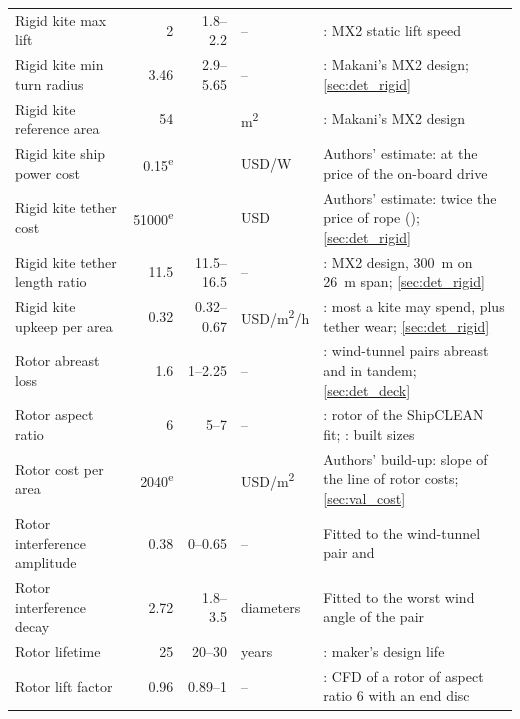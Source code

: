 \begin{longtable}{@{}>{\raggedright\arraybackslash}p{3.4cm}rr>{\raggedright\arraybackslash}p{1.4cm}>{\raggedright\arraybackslash}p{5.8cm}@{}}
Rigid kite max lift & \num{2} & \num{1.8}--\num{2.2} & -- & \citet[Table 1]{joshi2024powercurve}: MX2 static lift speed \\
Rigid kite min turn radius & \num{3.46} & \num{2.9}--\num{5.65} & -- & \citet{echeverri2020part1}: Makani's MX2 design; \cref{sec:det_rigid} \\
Rigid kite reference area & \num{54} &  & m\textsuperscript{2} & \citet[Part I, Table 2]{echeverri2020part1}: Makani's MX2 design \\
Rigid kite ship power cost & \num{0.15}\textsuperscript{e} &  & USD/W & Authors' estimate: at the price of the on-board drive \\
Rigid kite tether cost & \num{51000}\textsuperscript{e} &  & USD & Authors' estimate: twice the price of rope (\citealp[p. 703]{joshi2025}); \cref{sec:det_rigid} \\
Rigid kite tether length ratio & \num{11.5} & \num{11.5}--\num{16.5} & -- & \citet[Part I, Table 2]{echeverri2020part1}: MX2 design, 300~m on 26~m span; \cref{sec:det_rigid} \\
Rigid kite upkeep per area & \num{0.32} & \num{0.32}--\num{0.67} & USD/m\textsuperscript{2}/h & \citet[pp. 108-110]{echeverri2020part1}: most a kite may spend, plus tether wear; \cref{sec:det_rigid} \\
Rotor abreast loss & \num{1.6} & \num{1}--\num{2.25} & -- & \citet[Figs. 17-18]{bordogna2020}: wind-tunnel pairs abreast and in tandem; \cref{sec:det_deck} \\
Rotor aspect ratio & \num{6} & \num{5}--\num{7} & -- & \citet{tillig2020}: rotor of the ShipCLEAN fit; \citet{norsepower2025}: built sizes \\
Rotor cost per area & \num{2040}\textsuperscript{e} &  & USD/m\textsuperscript{2} & Authors' build-up: slope of the line of rotor costs; \cref{sec:val_cost} \\
Rotor interference amplitude & \num{0.38} & \num{0}--\num{0.65} & -- & Fitted to the \citet{bordogna2020} wind-tunnel pair and \citet{han2025} \\
Rotor interference decay & \num{2.72} & \num{1.8}--\num{3.5} & diameters & Fitted to the worst wind angle of the \citet{bordogna2020} pair \\
Rotor lifetime & \num{25} & \num{20}--\num{30} & years & \citet{anemoi_deploy}: maker's design life \\
Rotor lift factor & \num{0.96} & \num{0.89}--\num{1} & -- & \citet[Table 1]{han2025}: CFD of a rotor of aspect ratio 6 with an end disc \\

\end{longtable}
